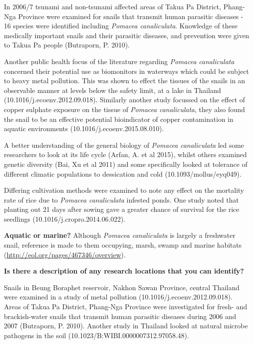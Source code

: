 \documentclass[]{book}
\theoremstyle{definition}
\theoremstyle{definition}
\theoremstyle{definition}
\theoremstyle{remark}
\begin{document}
In 2006/7 tsunami and non-tsunami affected areas of Takua Pa District,
Phang-Nga Province were examined for snails that transmit human
parasitic diseases - 16 species were identified including \emph{Pomacea
canaliculata}. Knowledge of these medically important snails and their
parasitic diseases, and prevention were given to Takua Pa people
(Butraporn, P. 2010).

Another public health focus of the literature regarding \emph{Pomacea
canaliculata} concerned their potential use as biomonitors in waterways
which could be subject to heavy metal pollution. This was shown to
effect the tissues of the snails in an observable manner at levels below
the safety limit, at a lake in Thailand (10.1016/j.ecoenv.2012.09.018).
Similarly another study focussed on the effect of copper sulphate
exposure on the tissue of \emph{Pomacea canaliculata}, they also found
the snail to be an effective potential bioindicator of copper
contamination in aquatic environments (10.1016/j.ecoenv.2015.08.010).

A better understanding of the general biology of \emph{Pomacea
canaliculata} led some researchers to look at its life cycle (Arfan, A.
et al 2015), whilst others examined genetic diversity (Bai, Xu et al
2011) and some specifically looked at tolerance of different climatic
populations to dessication and cold (10.1093/mollus/eyq049).

Differing cultivation methods were examined to note any effect on the
mortality rate of rice due to \emph{Pomacea canaliculata} infested
ponds. One study noted that planting out 21 days after sowing gave a
greater chance of survival for the rice seedlings
(10.1016/j.cropro.2014.06.022).

\textbf{Aquatic or marine?} Although \emph{Pomacea canaliculata} is
largely a freshwater snail, reference is made to them occupying, marsh,
swamp and marine habitats (\url{http://eol.org/pages/467346/overview}).

\textbf{Is there a description of any research locations that you can
identify?}

Snails in Beung Boraphet reservoir, Nakhon Sawan Province, central
Thailand were examined in a study of metal pollution
(10.1016/j.ecoenv.2012.09.018). Areas of Takua Pa District, Phang-Nga
Province were investigated for fresh- and brackish-water snails that
transmit human parasitic diseases during 2006 and 2007 (Butraporn, P.
2010). Another study in Thailand looked at natural microbe pathogens in
the soil (10.1023/B:WIBI.0000007312.97058.48).
\end{document}

